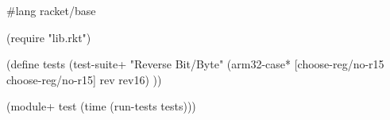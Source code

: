 #lang racket/base

(require
  "lib.rkt")

(define tests
  (test-suite+ "Reverse Bit/Byte"
    (arm32-case* [choose-reg/no-r15 choose-reg/no-r15]
      rev
      rev16)
))

(module+ test
  (time (run-tests tests)))
